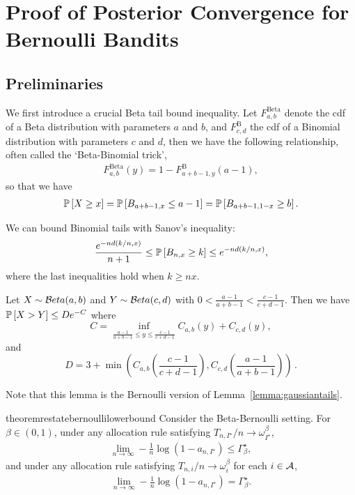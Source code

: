 \section{Proof of Posterior Convergence for Bernoulli Bandits}\label{app:posterior_beta}

\subsection{Preliminaries}\label{app:posterior_beta.pre}

We first introduce a crucial Beta tail bound inequality. Let $F^{\text{Beta}}_{a,b}$ denote the cdf of a Beta distribution with parameters $a$ and $b$, and $F^{\text{B}}_{c,d}$ the cdf of a Binomial distribution with parameters $c$ and $d$, then we have the following relationship, often called the `Beta-Binomial trick',
\begin{align*}
F^{\text{Beta}}_{a,b}(y) = 1 - F^{\text{B}}_{a+b-1, y} (a-1), 
\end{align*}
so that we have
\begin{align*}
\mathbb{P}\left[X \geq x\right] = \mathbb{P}\left[B_{a+b-1,x}  \leq a-1 \right] = \mathbb{P}\left[B_{a+b-1,1-x} \geq b\right].
\end{align*}

We can bound Binomial tails with Sanov's inequality:
\begin{align*}
    \frac{ e^{-n d \left( k / n, x \right)}  }{n+1} \leq \mathbb{P}\left[B_{n,x} \geq k\right] \leq e^{-n d \left( k / n, x \right)},
\end{align*}
where the last inequalities hold when $k \geq nx$.

\begin{lemma}\label{lemma:binomial_tail}
Let $X \sim \mathcal{B} eta(a, b)$ and $Y\sim \mathcal{B} eta(c, d)$ with $0 < \frac{a-1}{a+b-1} < \frac{c-1}{c+d-1}$. Then we have $\mathbb{P}\left[X > Y\right] \leq D e^{-C}$ where
\[
    C = \inf_{\frac{a-1}{a+b-1} \leq y \leq \frac{c-1}{c+d-1}} C_{a,b}(y)+C_{c,d}(y),
\]
and
\[
    D = 3 + \min \left( C_{a,b}\left(\frac{c-1}{c+d-1}\right), C_{c,d}\left(\frac{a-1}{a+b-1}\right) \right)\,.
\]
\end{lemma}
Note that this lemma is the Bernoulli version of Lemma~\ref{lemma:gaussiantails}.
\begin{restatable}{theorem}{restatebernoullilowerbound}\label{thm:bernoulli_lower_bound}
	Consider the Beta-Bernoulli setting. For $\beta \in (0,1)$, under any allocation rule satisfying 
	$T_{n, I^\star} / n \rightarrow \omega_{I^\star}^\beta$,
	\begin{align*}
	\lim_{n \rightarrow \infty} - \frac{1}{n} \log(1 - a_{n,I^\star}) \leq \Gamma_{\beta}^\star,
	\end{align*}
	and under any allocation rule satisfying $T_{n, i} / n \rightarrow \omega_i^\beta$ for each $i \in \mathcal{A}$,
	\begin{align*}
		\lim_{n \rightarrow \infty} - \frac{1}{n} \log(1 - a_{n,I^\star}) = \Gamma_{\beta}^\star.
	\end{align*}
\end{restatable}

